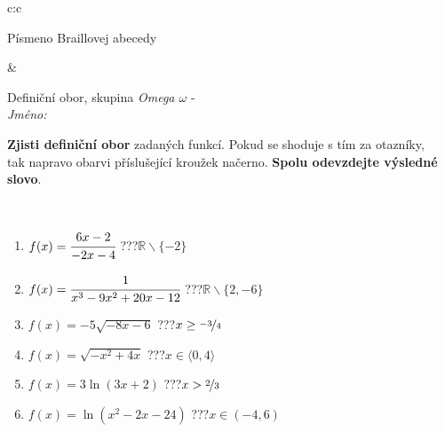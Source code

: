 \documentclass[10pt]{report}
\begin{document}
\begin{tabular}{c:c}
\begin{minipage}[c][104.5mm][t]{0.5\linewidth}
\begin{center}
\begin{minipage}{0.20\linewidth}
\begin{center}
{\small Písmeno Braillovej abecedy}
\end{center}
\end{minipage}
\end{center}
\end{minipage}
&
\begin{minipage}[c][104.5mm][t]{0.5\linewidth}
\begin{center}
\vspace{7mm}
{\huge Definiční obor, skupina \textit{Omega $\omega$} -}\\[5mm]
\textit{Jméno:}\phantom{xxxxxxxxxxxxxxxxxxxxxxxxxxxxxxxxxxxxxxxxxxxxxxxxxxxxxxxxxxxxxxxxx}\\[5mm]
\begin{minipage}{0.95\linewidth}
\begin{center}
\textbf{Zjisti definiční obor} zadaných funkcí. Pokud se shoduje s tím za otazníky,\\tak napravo obarvi příslušející kroužek načerno. \textbf{Spolu odevzdejte výsledné slovo}.
\end{center}
\end{minipage}
\\[1mm]
\begin{minipage}{0.79\linewidth}
\begin{center}
\begin{varwidth}{\linewidth}
\begin{enumerate}
\normalsizerrr
\item $f(x)=\cfrac{6x-2}{-2x-4}$\quad \dotfill\; ???\;\dotfill \quad $\mathbb{R}\smallsetminus\{-2\}$
\item $f(x)=\cfrac{1}{x^3-9x^2+20x-12}$\quad \dotfill\; ???\;\dotfill \quad $\mathbb{R}\smallsetminus\{2,-6\}$
\item $f(x)=-5\sqrt{-8x-6}$\quad \dotfill\; ???\;\dotfill \quad $x\geq\nicefrac{-3}{4}$
\item $f(x)=\sqrt{-x^2+4x}$\quad \dotfill\; ???\;\dotfill \quad $x\in\langle0 , 4\rangle$
\item $f(x)=3\ln{(3x+2)}$\quad \dotfill\; ???\;\dotfill \quad $x>\nicefrac{2}{3}$
\item $f(x)=\ln{(x^2-2x-24)}$\quad \dotfill\; ???\;\dotfill \quad $x\in(-4 , 6)$
\end{enumerate}
\end{varwidth}
\end{center}
\end{minipage}
\begin{minipage}{0.20\linewidth}
\begin{center}

\end{center}
\end{minipage}
\end{center}
\end{minipage}
\end{tabular}
\end{document}
